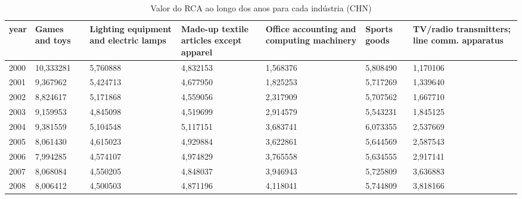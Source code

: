 \begin{table}
\centering
\caption{Valor do RCA ao longo dos anos para cada indústria (CHN)}
\begin{tabular}{p{1cm}p{2cm}p{2cm}p{2cm}p{2cm}p{2cm}p{2cm}}
\toprule
 year &  Games and toys &  Lighting equipment and electric lamps &  Made-up textile articles except apparel &  Office accounting and computing machinery &  Sports goods &  TV/radio transmitters; line comm. apparatus \\
\midrule
 2000 &       10,333281 &                               5,760888 &                                 4,832153 &                                   1,568376 &      5,808490 &                                     1,170106 \\
 2001 &        9,367962 &                               5,424713 &                                 4,677950 &                                   1,825253 &      5,717269 &                                     1,339640 \\
 2002 &        8,824617 &                               5,171868 &                                 4,559056 &                                   2,317909 &      5,707562 &                                     1,667710 \\
 2003 &        9,159953 &                               4,845098 &                                 4,519699 &                                   2,914579 &      5,543231 &                                     1,845125 \\
 2004 &        9,381559 &                               5,104548 &                                 5,117151 &                                   3,683741 &      6,073355 &                                     2,537669 \\
 2005 &        8,061430 &                               4,615023 &                                 4,929884 &                                   3,622861 &      5,644569 &                                     2,587543 \\
 2006 &        7,994285 &                               4,574107 &                                 4,974829 &                                   3,765558 &      5,634555 &                                     2,917141 \\
 2007 &        8,068084 &                               4,550205 &                                 4,848037 &                                   3,946943 &      5,725809 &                                     3,636883 \\
 2008 &        8,006412 &                               4,500503 &                                 4,871196 &                                   4,118041 &      5,744809 &                                     3,818166 \\

\end{tabular}
\end{table}
